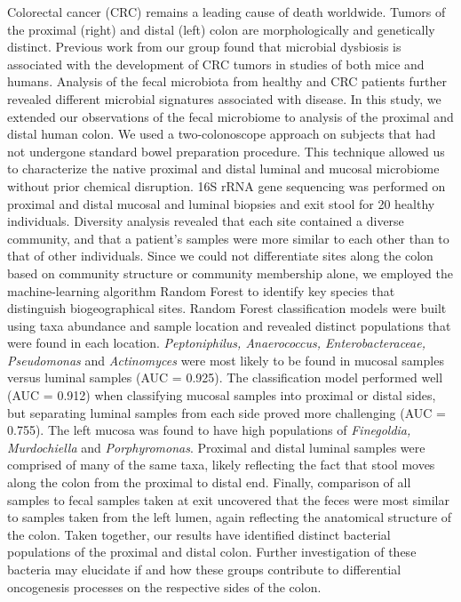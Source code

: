 \documentclass[11pt,]{article}
\begin{document}
Colorectal cancer (CRC) remains a leading cause of death worldwide.
Tumors of the proximal (right) and distal (left) colon are
morphologically and genetically distinct. Previous work from our group
found that microbial dysbiosis is associated with the development of CRC
tumors in studies of both mice and humans. Analysis of the fecal
microbiota from healthy and CRC patients further revealed different
microbial signatures associated with disease. In this study, we extended
our observations of the fecal microbiome to analysis of the proximal and
distal human colon. We used a two-colonoscope approach on subjects that
had not undergone standard bowel preparation procedure. This technique
allowed us to characterize the native proximal and distal luminal and
mucosal microbiome without prior chemical disruption. 16S rRNA gene
sequencing was performed on proximal and distal mucosal and luminal
biopsies and exit stool for 20 healthy individuals. Diversity analysis
revealed that each site contained a diverse community, and that a
patient's samples were more similar to each other than to that of other
individuals. Since we could not differentiate sites along the colon
based on community structure or community membership alone, we employed
the machine-learning algorithm Random Forest to identify key species
that distinguish biogeographical sites. Random Forest classification
models were built using taxa abundance and sample location and revealed
distinct populations that were found in each location.
\emph{Peptoniphilus, Anaerococcus, Enterobacteraceae, Pseudomonas} and
\emph{Actinomyces} were most likely to be found in mucosal samples
versus luminal samples (AUC = 0.925). The classification model performed
well (AUC = 0.912) when classifying mucosal samples into proximal or
distal sides, but separating luminal samples from each side proved more
challenging (AUC = 0.755). The left mucosa was found to have high
populations of \emph{Finegoldia, Murdochiella} and \emph{Porphyromonas}.
Proximal and distal luminal samples were comprised of many of the same
taxa, likely reflecting the fact that stool moves along the colon from
the proximal to distal end. Finally, comparison of all samples to fecal
samples taken at exit uncovered that the feces were most similar to
samples taken from the left lumen, again reflecting the anatomical
structure of the colon. Taken together, our results have identified
distinct bacterial populations of the proximal and distal colon. Further
investigation of these bacteria may elucidate if and how these groups
contribute to differential oncogenesis processes on the respective sides
of the colon.
\end{document}

